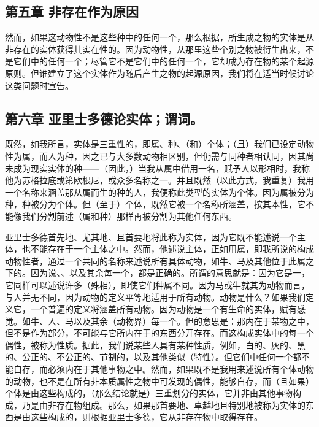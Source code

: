 
\subsection{第五章 非存在作为原因}

然而，如果这动物性不是这些种中的任何一个，那么根据，所生成之物的实体是从非存在的实体获得其实在性的。因为动物性，从那里这些个别之物被衍生出来，不是它们中的任何一个；尽管它不是它们中的任何一个，它却成为存在物的某个起源原则。但谁建立了这个实体作为随后产生之物的起源原因，我们将在适当时候讨论这类问题时宣告。\par


\subsection{第六章 亚里士多德论实体；谓词。}

既然，如我所言，实体是三重性的，即属、种、（和）个体；（且）我们已设定动物性为属，而人为种，因之已与大多数动物相区别，但仍需与同种者相认同，因其尚未成为现实实体的种——（因此，）当我从属中借用一名，赋予人以形相时，我称他为苏格拉底或第欧根尼，或众多名称之一。并且既然（以此方式，我重复）我用一个名称来涵盖那从属而生的种的人，我便称此类型的实体为个体。因为属被分为种，种被分为个体。但（至于）个体，既然它被一个名称所涵盖，按其本性，它不能像我们分割前述（属和种）那样再被分割为其他任何东西。\par

亚里士多德首先地、尤其地、且首要地将此称为实体，因为它既不能述说一个主体，也不能存在于一个主体之中。然而，他述说主体，正如用属，即我所说的构成动物性者，通过一个共同的名称来述说所有具体动物，如牛、马及其他位于此属之下的。因为说、、以及其余每一个，都是正确的。所谓的意思就是：因为它是一，它同样可以述说许多（殊相），即使它们种属不同。因为马或牛就其为动物而言，与人并无不同，因为动物的定义平等地适用于所有动物。动物是什么？如果我们定义它，一个普遍的定义将涵盖所有动物。因为动物是一个有生命的实体，赋有感觉。如牛、人、马以及其余（动物界）每一个。但的意思是：那内在于某物之中，但不是作为部分，不可能与它所内在于的东西分开存在。而这构成实体中的每一个偶性，被称为性质。据此，我们说某些人具有某种性质，例如，白的、灰的、黑的、公正的、不公正的、节制的，以及其他类似（特性）。但它们中任何一个都不能自存，而必须内在于其他事物之中。然而，如果既不是我用来述说所有个体动物的动物，也不是在所有非本质属性之物中可发现的偶性，能够自存，而（且如果）个体是由这些构成的，（那么结论就是）三重划分的实体，它并非由其他事物构成，乃是由非存在物组成。那么，如果那首要地、卓越地且特别地被称为实体的东西是由这些构成的，则根据亚里士多德，它从非存在物中取得存在。\par

